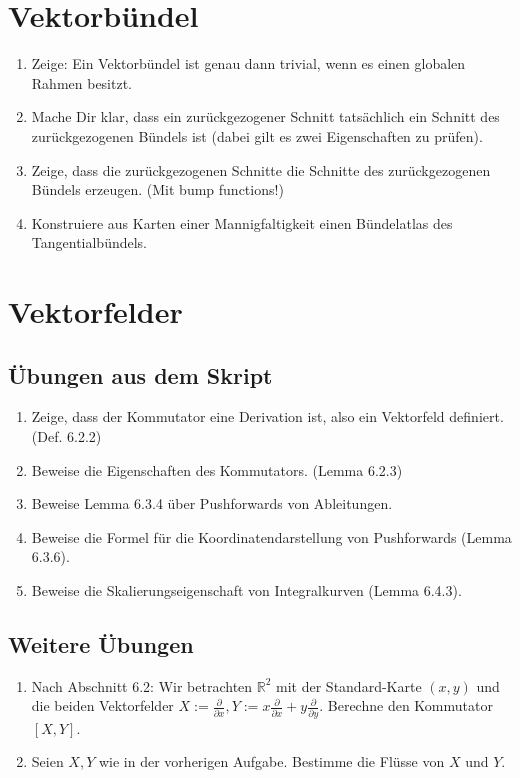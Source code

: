 \documentclass[a4paper]{scrartcl}
\newcommand{\R}{\mathbb{R}}
\begin{document}
	\section{Vektorbündel}
	\begin{enumerate}
		\item Zeige: Ein Vektorbündel ist genau dann trivial, wenn es einen globalen Rahmen besitzt.
		\item Mache Dir klar, dass ein zurückgezogener Schnitt tatsächlich ein Schnitt des zurückgezogenen Bündels ist (dabei gilt es zwei Eigenschaften zu prüfen).
		\item Zeige, dass die zurückgezogenen Schnitte die Schnitte des zurückgezogenen Bündels erzeugen. (Mit bump functions!)
		\item Konstruiere aus Karten einer Mannigfaltigkeit einen Bündelatlas des Tangentialbündels.
	\end{enumerate}

	\section{Vektorfelder}
	\subsection{Übungen aus dem Skript}
	\begin{enumerate}
		\item Zeige, dass der Kommutator eine Derivation ist, also ein Vektorfeld definiert. (Def. 6.2.2)
		\item Beweise die Eigenschaften des Kommutators. (Lemma 6.2.3)
		\item Beweise Lemma 6.3.4 über Pushforwards von Ableitungen.
		\item Beweise die Formel für die Koordinatendarstellung von Pushforwards (Lemma 6.3.6).
		\item Beweise die Skalierungseigenschaft von Integralkurven (Lemma 6.4.3).
	\end{enumerate}
	\subsection{Weitere Übungen}
	\begin{enumerate}
		\item Nach Abschnitt 6.2: Wir betrachten $\R^2$ mit der Standard-Karte $(x,y)$ und die beiden Vektorfelder $X := \frac{\partial}{\partial x}, Y := x \frac{\partial}{\partial x} + y \frac{\partial}{\partial y}$. Berechne den Kommutator $[X,Y]$.
		\item Seien $X,Y$ wie in der vorherigen Aufgabe. Bestimme die Flüsse von $X$ und $Y$.
	\end{enumerate}
\end{document}
